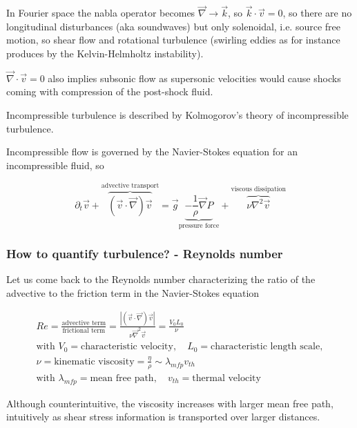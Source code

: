 In Fourier space the nabla operator becomes $\vec{\nabla} \rightarrow \vec{k}$, so $\vec{k} \cdot \vec{v} = 0$, so there
are no longitudinal disturbances (aka soundwaves) but only solenoidal, i.e. source free motion, so shear flow and rotational turbulence
(swirling eddies as for instance produces by the Kelvin-Helmholtz instability).

$\vec{\nabla} \cdot \vec{v} = 0$ also implies subsonic flow as supersonic velocities would cause shocks coming with compression of the post-shock fluid.

\textcolor{blue1}{Incompressible turbulence is described by Kolmogorov's theory of incompressible turbulence}.

Incompressible flow is governed by the Navier-Stokes equation for an incompressible fluid, so

\begin{equation}
    \partial_t \vec{v} + \overbrace{(\vec{v} \cdot \vec{\nabla}) \vec{v}}^{\text{advective transport}} = \vec{g} \underbrace{- \frac{1}{\rho} \vec{\nabla} P}_{\text{pressure force}} + \overbrace{\nu \nabla^2 \vec{v}}^{\text{viscous dissipation}}
\end{equation}

\subsubsection{How to quantify turbulence? - Reynolds number}
Let us come back to the Reynolds number characterizing the ratio of the advective to the friction term in the Navier-Stokes equation

\begin{equation}
    \begin{gathered}
        Re = \frac{\text{advective term}}{\text{frictional term}} = \frac{|(\vec{v}\cdot \vec{\nabla})\vec{v}|}{\nu \vec{\nabla}^2 \vec{v}} = \frac{V_0 L_0}{\nu} \\
        \text{with } V_0 = \text{characteristic velocity}, \quad L_0 = \text{characteristic length scale}, \\ \nu = \text{kinematic viscosity} = \frac{\eta}{\rho} \sim \lambda_{mfp} v_{th} \\
        \text{with } \lambda_{mfp} = \text{mean free path}, \quad v_{th} = \text{thermal velocity}
    \end{gathered}
\end{equation}

Although counterintuitive, the viscosity increases with larger mean free path, intuitively as shear stress information is transported
over larger distances.

